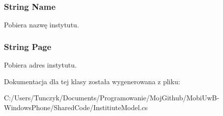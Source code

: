 \hypertarget{a00025_a934fa09ba291a97f43720640e4d83f25}{}
\subsubsection[{Name}]{\setlength{\rightskip}{0pt plus 5cm}String Name\hspace{0.3cm}{\ttfamily [get]}}\label{a00025_a934fa09ba291a97f43720640e4d83f25}


Pobiera nazwę instytutu. 

\hypertarget{a00025_ac10faeb4ca37a68823004b0a1a34fa29}{}
\subsubsection[{Page}]{\setlength{\rightskip}{0pt plus 5cm}String Page\hspace{0.3cm}{\ttfamily [get]}}\label{a00025_ac10faeb4ca37a68823004b0a1a34fa29}


Pobiera adres instytutu. 



Dokumentacja dla tej klasy została wygenerowana z pliku\+:\begin{DoxyCompactItemize}
\item 
C\+:/\+Users/\+Tunczyk/\+Documents/\+Programowanie/\+Moj\+Github/\+Mobi\+Uw\+B-\/\+Windows\+Phone/\+Shared\+Code/Institiute\+Model.\+cs\end{DoxyCompactItemize}
